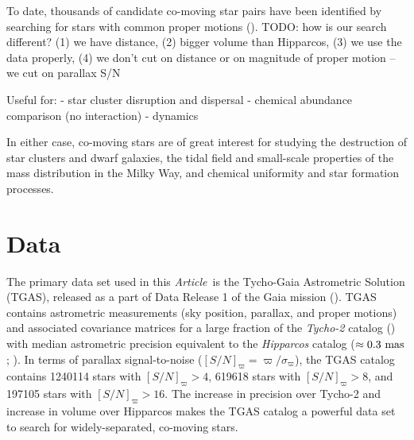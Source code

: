 \documentclass[manuscript, letterpaper]{aastex6}
\newcommand{\project}[1]{\textsl{#1}}
\newcommand{\documentname}{\textsl{Article}}
\newcommand{\kms}{\rm km~s^{-1}}
\newcommand{\snr}{[S/N]_\varpi}
\newcommand{\todo}[1]{{\color{red}TODO: #1}}
\begin{document}
To date, thousands of candidate co-moving star pairs have been identified by
searching for stars with common proper motions (\citealt{Luyten:1979,
Poveda:1994, Allen:2000, Gould:2003, Chaname:2004, Lepine:2007,
Alonso-Floriano:2015}). \todo{how is our search different? (1) we have distance, (2) bigger volume than Hipparcos, (3) we use the data properly, (4) we don't cut on distance or on magnitude of proper motion -- we cut on parallax S/N}



Useful for:
- star cluster disruption and dispersal
- chemical abundance comparison (no interaction)
- dynamics

In either case, co-moving stars are of great interest
for studying the destruction of star clusters and dwarf galaxies, the tidal
field and small-scale properties of the mass distribution in the Milky Way, and
chemical uniformity and star formation processes.

\section{Data} \label{sec:data}

The primary data set used in this \documentname\ is the Tycho-Gaia Astrometric
Solution (TGAS), released as a part of Data Release 1 of the Gaia mission
(\citealt{many}). TGAS contains astrometric measurements (sky position,
parallax, and proper motions) and associated covariance matrices for a large
fraction of the \project{Tycho-2} catalog (\citealt{tycho2}) with median
astrometric precision equivalent to the \project{Hipparcos} catalog ($\approx
0.3~{\rm mas}$; \citealt{hipparcos}). In terms of parallax signal-to-noise
($\snr = \varpi/\sigma_\varpi$), the TGAS catalog contains 1240114 stars with
$\snr > 4$, 619618 stars with $\snr > 8$, and 197105 stars with $\snr > 16$. The
increase in precision over Tycho-2 and increase in volume over Hipparcos makes
the TGAS catalog a powerful data set to search for widely-separated, co-moving
stars.
\end{document}
